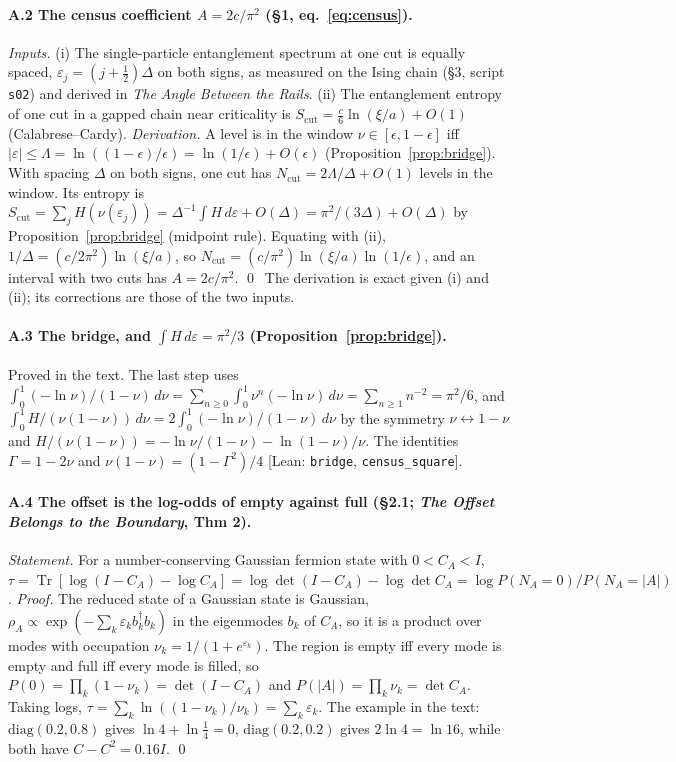 \documentclass[11pt]{article}
\theoremstyle{definition}
\newcommand{\Tr}{\operatorname{Tr}}
\begin{document}
\paragraph{A.2 The census coefficient $A=2c/\pi^2$ (§1, eq.~\ref{eq:census}).}
\emph{Inputs.} (i) The single-particle entanglement spectrum at one cut is equally spaced, $\varepsilon_j=(j+\tfrac12)\Delta$ on both signs, as measured on the Ising chain (§3, script \texttt{s02}) and derived in \emph{The Angle Between the Rails}. (ii) The entanglement entropy of one cut in a gapped chain near criticality is $S_{\mathrm{cut}}=\tfrac c6\ln(\xi/a)+O(1)$ (Calabrese–Cardy).
\emph{Derivation.} A level is in the window $\nu\in[\epsilon,1-\epsilon]$ iff $|\varepsilon|\le\Lambda=\ln((1-\epsilon)/\epsilon)=\ln(1/\epsilon)+O(\epsilon)$ (Proposition~\ref{prop:bridge}). With spacing $\Delta$ on both signs, one cut has $N_{\mathrm{cut}}=2\Lambda/\Delta+O(1)$ levels in the window. Its entropy is $S_{\mathrm{cut}}=\sum_jH(\nu(\varepsilon_j))=\Delta^{-1}\int H\,d\varepsilon+O(\Delta)=\pi^2/(3\Delta)+O(\Delta)$ by Proposition~\ref{prop:bridge} (midpoint rule). Equating with (ii), $1/\Delta=(c/2\pi^2)\ln(\xi/a)$, so $N_{\mathrm{cut}}=(c/\pi^2)\ln(\xi/a)\ln(1/\epsilon)$, and an interval with two cuts has $A=2c/\pi^2$. \qed\ The derivation is exact given (i) and (ii); its corrections are those of the two inputs.

\paragraph{A.3 The bridge, and $\int H\,d\varepsilon=\pi^2/3$ (Proposition~\ref{prop:bridge}).}
Proved in the text. The last step uses $\int_0^1(-\ln\nu)/(1-\nu)\,d\nu=\sum_{n\ge0}\int_0^1\nu^n(-\ln\nu)\,d\nu=\sum_{n\ge1}n^{-2}=\pi^2/6$, and $\int_0^1H/(\nu(1-\nu))\,d\nu=2\int_0^1(-\ln\nu)/(1-\nu)\,d\nu$ by the symmetry $\nu\leftrightarrow1-\nu$ and $H/(\nu(1-\nu))=-\ln\nu/(1-\nu)-\ln(1-\nu)/\nu$. The identities $\Gamma=1-2\nu$ and $\nu(1-\nu)=(1-\Gamma^2)/4$ \textsf{[Lean: \texttt{bridge}, \texttt{census\_square}]}.

\paragraph{A.4 The offset is the log-odds of empty against full (§2.1; \emph{The Offset Belongs to the Boundary}, Thm 2).}
\emph{Statement.} For a number-conserving Gaussian fermion state with $0<C_A<I$, $\tau=\Tr[\log(I-C_A)-\log C_A]=\log\det(I-C_A)-\log\det C_A=\log P(N_A=0)/P(N_A=|A|)$.
\emph{Proof.} The reduced state of a Gaussian state is Gaussian, $\rho_A\propto\exp(-\sum_k\varepsilon_kb_k^\dagger b_k)$ in the eigenmodes $b_k$ of $C_A$, so it is a product over modes with occupation $\nu_k=1/(1+e^{\varepsilon_k})$. The region is empty iff every mode is empty and full iff every mode is filled, so $P(0)=\prod_k(1-\nu_k)=\det(I-C_A)$ and $P(|A|)=\prod_k\nu_k=\det C_A$. Taking logs, $\tau=\sum_k\ln((1-\nu_k)/\nu_k)=\sum_k\varepsilon_k$. The example in the text: $\mathrm{diag}(0.2,0.8)$ gives $\ln4+\ln\tfrac14=0$, $\mathrm{diag}(0.2,0.2)$ gives $2\ln4=\ln16$, while both have $C-C^2=0.16I$. \qed
\end{document}
